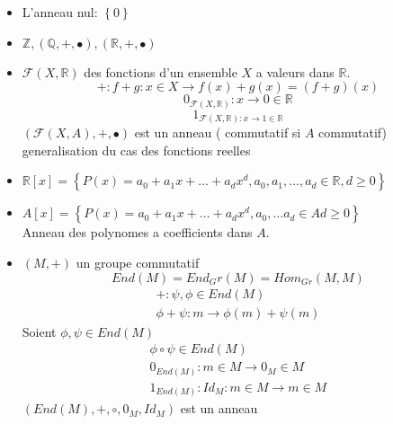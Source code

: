 \documentclass[../main.tex]{subfiles}
\begin{document}
\begin{exemple}
\begin{itemize}
\item L'anneau nul: $ \left\{ 0 \right\} $
\item $\mathbb{Z}, ( \mathbb{Q}, +, \bullet), ( \mathbb{R}, +,\bullet)$ 
\item $ \mathcal{F}(X,\mathbb{R})$ des fonctions d'un ensemble $X$ a valeurs dans $\mathbb{R}$.
	\[ 
		+: f+g : x \in X \to f(x) + g(x) = ( f+g)(x)
	\]
	\[ 
		0_{\mathcal{F}(X,\mathbb{R})} : x \to 0 \in \mathbb{R}
	\]
	\[ 
		1_{\mathcal{F}(X,\mathbb{R}): x \to 1 \in \mathbb{R}} 
	\]
	$ \left( \mathcal{F}(X,A), + , \bullet \right)$ est un anneau ( commutatif si $A$ commutatif) generalisation du cas des fonctions reelles

\item $\mathbb{R}[x] = \left\{ P(x) = a_0 + a_1x + \ldots + a_d x^{d}, a_0,a_1, \ldots, a_d \in \mathbb{R}, d \geq 0 \right\} $

\item $A[x] = \left\{ P(x) = a_0+ a_1x+ \ldots + a_d x^{d}, a_0, \ldots a_d \in A d \geq 0 \right\} $\\
	Anneau des polynomes a coefficients dans $A$.
\item $(M,+)$ un groupe commutatif
	\[ 
		End(M) = End_Gr(M) = Hom_{Gr} (M,M)
	\]
	\begin{align*}
		+: \psi, \phi \in End(M)\\
		\phi + \psi : m \to 
		 \phi(m) + \psi(m)
	\end{align*}
	Soient $\phi, \psi \in End(M)$ 
	\begin{align*}
		\phi \circ \psi \in End(M)\\
		0_{End(M)} : m \in M \to 0_M \in M\\
		1_{End(M)} : Id_M : m \in M \to m \in M	
	\end{align*}
	$\left( End(M), +, \circ, 0_M, Id_M\right)$ est un anneau
\end{itemize}
\end{exemple}
\end{document}
